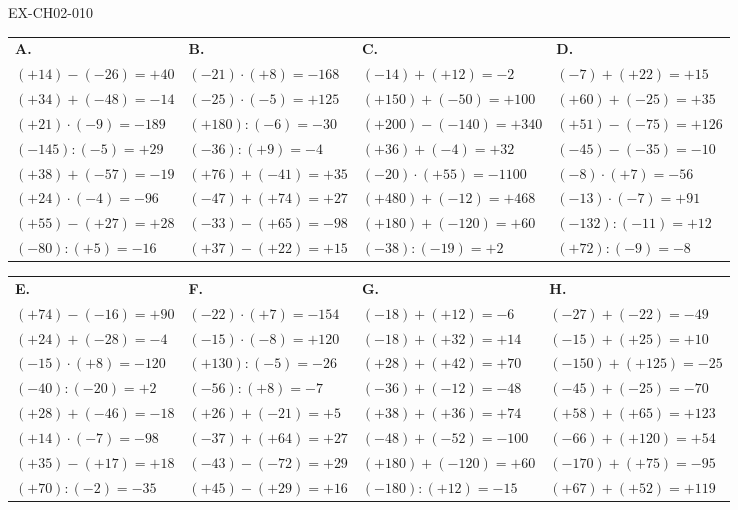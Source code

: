 \documentclass[12pt, a4paper]{article}
\begin{document}
\begin{solution}{EX-CH02-010}

\def\arraystretch{1.7}
\begin{tabularx}{\linewidth}{*{4}{X}}
\textbf{A.} & \textbf{B.} & \textbf{C.} & \textbf{D.} \\
$(+14)-(-26)=+40$ & $(-21)\cdot(+8)=-168$ & $(-14)+(+12)=-2$ & $(-7)+(+22)=+15$ \\
$(+34)+(-48)=-14$ & $(-25)\cdot(-5)=+125$ & $(+150)+(-50)=+100$ & $(+60)+(-25)=+35$ \\
$(+21)\cdot(-9)=-189$ & $(+180):(-6)=-30$ & $(+200)-(-140)=+340$ & $(+51)-(-75)=+126$ \\
$(-145):(-5)=+29$ & $(-36):(+9)=-4$ & $(+36)+(-4)=+32$ & $(-45)-(-35)=-10$ \\
$(+38)+(-57)=-19$ & $(+76)+(-41)=+35$ & $(-20)\cdot(+55)=-1100$ & $(-8)\cdot(+7)=-56$ \\
$(+24)\cdot(-4)=-96$ & $(-47)+(+74)=+27$ & $(+480)+(-12)=+468$ & $(-13)\cdot(-7)=+91$ \\
$(+55)-(+27)=+28$ & $(-33)-(+65)=-98$ & $(+180)+(-120)=+60$ & $(-132):(-11)=+12$ \\
$(-80):(+5)=-16$ & $(+37)-(+22)=+15$ & $(-38):(-19)=+2$ & $(+72):(-9)=-8$ \\
\end{tabularx}

\bigskip
\begin{tabularx}{\linewidth}{*{4}{X}}
\textbf{E.} & \textbf{F.} & \textbf{G.} & \textbf{H.} \\
$(+74)-(-16)=+90$ & $(-22)\cdot(+7)=-154$ & $(-18)+(+12)=-6$ & $(-27)+(-22)=-49$ \\
$(+24)+(-28)=-4$ & $(-15)\cdot(-8)=+120$ & $(-18)+(+32)=+14$ & $(-15)+(+25)=+10$ \\
$(-15)\cdot(+8)=-120$ & $(+130):(-5)=-26$ & $(+28)+(+42)=+70$ & $(-150)+(+125)=-25$ \\
$(-40):(-20)=+2$ & $(-56):(+8)=-7$ & $(-36)+(-12)=-48$ & $(-45)+(-25)=-70$ \\
$(+28)+(-46)=-18$ & $(+26)+(-21)=+5$ & $(+38)+(+36)=+74$ & $(+58)+(+65)=+123$ \\
$(+14)\cdot(-7)=-98$ & $(-37)+(+64)=+27$ & $(-48)+(-52)=-100$ & $(-66)+(+120)=+54$ \\
$(+35)-(+17)=+18$ & $(-43)-(-72)=+29$ & $(+180)+(-120)=+60$ & $(-170)+(+75)=-95$ \\
$(+70):(-2)=-35$ & $(+45)-(+29)=+16$ & $(-180):(+12)=-15$ & $(+67)+(+52)=+119$ \\
\end{tabularx}


\end{solution}
\end{document}
